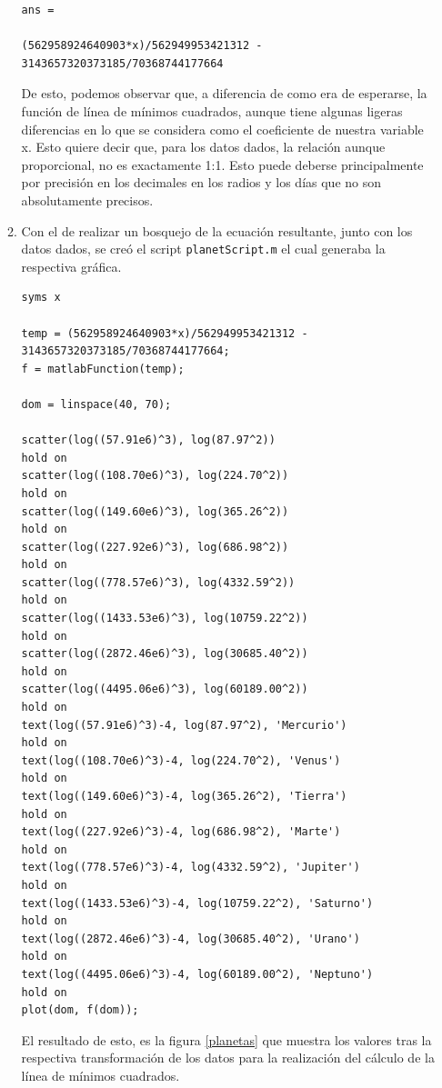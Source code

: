 \documentclass[english,notitlepage,letterpaper, 10pt]{article} %
\begin{document}
\begin{enumerate}
\begin{enumerate}
      \begin{lstlisting}
ans =

(562958924640903*x)/562949953421312 - 3143657320373185/70368744177664
      \end{lstlisting}

      De esto, podemos observar que, a diferencia de como era de esperarse, la función de línea de mínimos cuadrados, aunque tiene algunas ligeras diferencias en lo que se considera como el coeficiente de nuestra variable x. Esto quiere decir que, para los datos dados, la relación aunque proporcional, no es exactamente 1:1. Esto puede deberse principalmente por precisión en los decimales en los radios y los días que no son absolutamente precisos.

      \item Con el de realizar un bosquejo de la ecuación resultante, junto con los datos dados, se creó el script \texttt{planetScript.m} el cual generaba la respectiva gráfica.
      
      \begin{lstlisting}
syms x

temp = (562958924640903*x)/562949953421312 - 3143657320373185/70368744177664;
f = matlabFunction(temp);

dom = linspace(40, 70);

scatter(log((57.91e6)^3), log(87.97^2))
hold on
scatter(log((108.70e6)^3), log(224.70^2))
hold on
scatter(log((149.60e6)^3), log(365.26^2))
hold on
scatter(log((227.92e6)^3), log(686.98^2))
hold on
scatter(log((778.57e6)^3), log(4332.59^2))
hold on
scatter(log((1433.53e6)^3), log(10759.22^2))
hold on
scatter(log((2872.46e6)^3), log(30685.40^2))
hold on
scatter(log((4495.06e6)^3), log(60189.00^2))
hold on
text(log((57.91e6)^3)-4, log(87.97^2), 'Mercurio')
hold on
text(log((108.70e6)^3)-4, log(224.70^2), 'Venus')
hold on
text(log((149.60e6)^3)-4, log(365.26^2), 'Tierra')
hold on
text(log((227.92e6)^3)-4, log(686.98^2), 'Marte')
hold on
text(log((778.57e6)^3)-4, log(4332.59^2), 'Jupiter')
hold on
text(log((1433.53e6)^3)-4, log(10759.22^2), 'Saturno')
hold on
text(log((2872.46e6)^3)-4, log(30685.40^2), 'Urano')
hold on
text(log((4495.06e6)^3)-4, log(60189.00^2), 'Neptuno')
hold on
plot(dom, f(dom));
      \end{lstlisting}

      El resultado de esto, es la figura \ref{planetas} que muestra los valores tras la respectiva transformación de los datos para la realización del cálculo de la línea de mínimos cuadrados.


\end{enumerate}
\end{enumerate}
\end{document}
